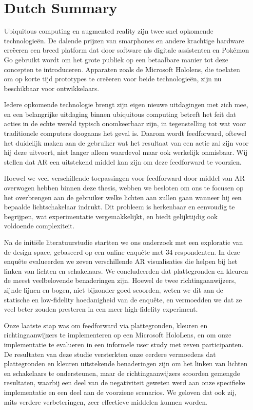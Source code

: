 \chapter{Dutch Summary} \label{chap:summary}

Ubiquitous computing en augmented reality zijn twee snel opkomende technologieën. De dalende prijzen van smarphones en andere krachtige hardware creëeren een breed platform dat door software als digitale assistenten en Pokémon Go gebruikt wordt om het grote publiek op een betaalbare manier tot deze concepten te introduceren. Apparaten zoals de Microsoft Hololens, die toelaten om op korte tijd prototypes te creëeren voor beide technologieën, zijn nu beschikbaar voor ontwikkelaars.

Iedere opkomende technologie brengt zijn eigen nieuwe uitdagingen met zich mee, en een belangrijke uitdaging binnen ubiquitous computing betreft het feit dat acties in de echte wereld typisch onomkeerbaar zijn, in tegenstelling tot wat voor traditionele computers doogaans het geval is. Daarom wordt feedforward, oftewel het duidelijk maken aan de gebruiker wat het resultaat van een actie zal zijn voor hij deze uitvoert, niet langer alleen waardevol maar ook werkelijk onmisbaar. Wij stellen dat AR een uitstekend middel kan zijn om deze feedforward te voorzien.

Hoewel we veel verschillende toepassingen voor feedforward door middel van AR overwogen hebben binnen deze thesis, webben we besloten om ons te focusen op het overbrengen aan de gebruiker welke lichten aan zullen gaan wanneer hij een bepaalde lichtschakelaar indrukt. Dit probleem is herkenbaar en eenvoudig te begrijpen, wat experimentatie vergemakkelijkt, en biedt gelijktijdig ook voldoende complexiteit.

Na de initiële literatuurstudie startten we ons onderzoek met een exploratie van de design space, gebaseerd op een online enquête met 34 respondenten. In deze enquête evalueerden we zeven verschillende AR visualisaties die helpen bij het linken van lichten en schakelaars. We concludeerden dat plattegronden en kleuren de meest veelbelovende benaderingen zijn. Hoewel de twee richtingaanwijzers, zijnde lijnen en bogen, niet bijzonder goed scoorden, weten we dit aan de statische en low-fidelity hoedanigheid van de enquête, en vermoedden we dat ze veel beter zouden presteren in een meer high-fidelity experiment.

Onze laatste stap was om feedforward via plattegronden, kleuren en richtingaanwijzers te implementeren op een Microsoft HoloLens, en om onze implementatie te evalueren in een informele user study met zeven participanten. De resultaten van deze studie versterkten onze eerdere vermoedens dat plattegronden en kleuren uitstekende benaderingen zijn om het linken van lichten en schakelaars te ondersteunen, maar de richtingaanwijzers scoorden gemengde resultaten, waarbij een deel van de negativiteit geweten werd aan onze specifieke implementatie en een deel aan de voorziene scenarios. We geloven dat ook zij, mits verdere verbeteringen, zeer effectieve middelen kunnen worden.
